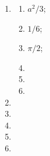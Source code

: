 \documentclass[a4paper, 11pt]{ctexart}
\begin{document}
\begin{enumerate}
    \item %
        \begin{multicols}{3}
            \begin{enumerate}[(1)]
                \item %
                    $a^2/3$;
                \item %
                    $1/6$;
                \item %
                    $\pi/2$;
                \item %
                \item %
                \item %
            \end{enumerate}
        \end{multicols}
    \item %
    \item %
    \item %
    \item %
    \item %
\end{enumerate}
\end{document}
